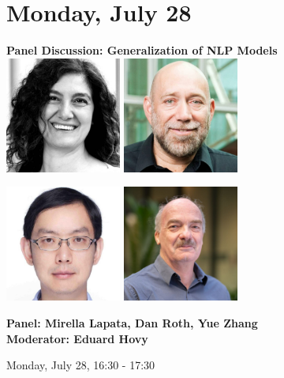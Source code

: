 \section{Monday, July 28}
\vspace*{0.2cm}

\begin{center}
    {\Large \textbf{Panel Discussion: Generalization of NLP Models}}\\

    \includegraphics[width=1.5in]{examples/acl25-handbook/invited_talks/Mirella.jpg}
    \includegraphics[width=1.5in]{examples/acl25-handbook/invited_talks/Dan.jpg}

    \includegraphics[width=1.5in]{examples/acl25-handbook/invited_talks/Yue.jpg}
    \includegraphics[width=1.5in]{examples/acl25-handbook/invited_talks/Ed.jpg}
    
    {\large \textbf{Panel: Mirella Lapata, Dan Roth, Yue Zhang}}\\
    {\large \textbf{Moderator: Eduard Hovy}}

    Monday, July 28, 16:30 - 17:30
\end{center}

